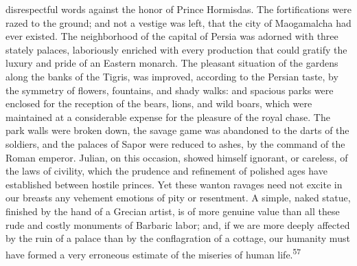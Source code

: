 disrespectful words against the honor of Prince Hormisdas. The
fortifications were razed to the ground; and not a vestige was
left, that the city of Maogamalcha had ever existed. The
neighborhood of the capital of Persia was adorned with three
stately palaces, laboriously enriched with every production that
could gratify the luxury and pride of an Eastern monarch. The
pleasant situation of the gardens along the banks of the Tigris,
was improved, according to the Persian taste, by the symmetry of
flowers, fountains, and shady walks: and spacious parks were
enclosed for the reception of the bears, lions, and wild boars,
which were maintained at a considerable expense for the pleasure
of the royal chase. The park walls were broken down, the savage
game was abandoned to the darts of the soldiers, and the palaces
of Sapor were reduced to ashes, by the command of the Roman
emperor. Julian, on this occasion, showed himself ignorant, or
careless, of the laws of civility, which the prudence and
refinement of polished ages have established between hostile
princes. Yet these wanton ravages need not excite in our breasts
any vehement emotions of pity or resentment. A simple, naked
statue, finished by the hand of a Grecian artist, is of more
genuine value than all these rude and costly monuments of
Barbaric labor; and, if we are more deeply affected by the ruin
of a palace than by the conflagration of a cottage, our humanity
must have formed a very erroneous estimate of the miseries of
human life.\textsuperscript{57}


